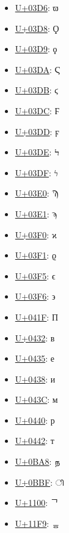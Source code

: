 \begin{itemize}
	\item \href{https://decodeunicode.org/en/u+03D6}{U+03D6}: ϖ
	\item \href{https://decodeunicode.org/en/u+03D8}{U+03D8}: Ϙ
	\item \href{https://decodeunicode.org/en/u+03D9}{U+03D9}: ϙ
	\item \href{https://decodeunicode.org/en/u+03DA}{U+03DA}: Ϛ
	\item \href{https://decodeunicode.org/en/u+03DB}{U+03DB}: ϛ
	\item \href{https://decodeunicode.org/en/u+03DC}{U+03DC}: Ϝ
	\item \href{https://decodeunicode.org/en/u+03DD}{U+03DD}: ϝ
	\item \href{https://decodeunicode.org/en/u+03DE}{U+03DE}: Ϟ
	\item \href{https://decodeunicode.org/en/u+03DF}{U+03DF}: ϟ
	\item \href{https://decodeunicode.org/en/u+03E0}{U+03E0}: Ϡ
	\item \href{https://decodeunicode.org/en/u+03E1}{U+03E1}: ϡ
	\item \href{https://decodeunicode.org/en/u+03F0}{U+03F0}: ϰ
	\item \href{https://decodeunicode.org/en/u+03F1}{U+03F1}: ϱ
	\item \href{https://decodeunicode.org/en/u+03F5}{U+03F5}: ϵ
	\item \href{https://decodeunicode.org/en/u+03F6}{U+03F6}: ϶
	\item \href{https://decodeunicode.org/en/u+041F}{U+041F}: П
	\item \href{https://decodeunicode.org/en/u+0432}{U+0432}: в
	\item \href{https://decodeunicode.org/en/u+0435}{U+0435}: е
	\item \href{https://decodeunicode.org/en/u+0438}{U+0438}: и
	\item \href{https://decodeunicode.org/en/u+043C}{U+043C}: м
	\item \href{https://decodeunicode.org/en/u+0440}{U+0440}: р
	\item \href{https://decodeunicode.org/en/u+0442}{U+0442}: т
	\item \href{https://decodeunicode.org/en/u+0BA8}{U+0BA8}: ந
	\item \href{https://decodeunicode.org/en/u+0BBF}{U+0BBF}: ி
	\item \href{https://decodeunicode.org/en/u+1100}{U+1100}: ᄀ
	\item \href{https://decodeunicode.org/en/u+11F9}{U+11F9}: ᇹ

\end{itemize}
